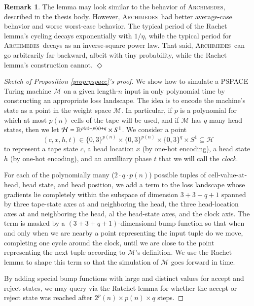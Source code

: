 \documentclass[openany, notitlepage, justified]{tufte-book}
\theoremstyle{plain}
\theoremstyle{definition}
\newtheorem{rmk}{Remark}
\newcommand{\Hh}{\mathcal{H}}
\newcommand{\Mm}{\mathcal{M}}
\newcommand{\mend}{\hfill $\Diamond$}
\newcommand{\Archimedes}{\textsc{Archimedes}}
\begin{document}
        \begin{rmk}
            The lemma may look similar to the behavior of \Archimedes,
            described in the thesis body.  However, \Archimedes\ had better
            average-case behavior and worse worst-case behavior. 
            The typical period of the Rachet lemma's cycling 
            decays exponentially with $1/\eta$, while the typical period for
            \Archimedes\ decays as an inverse-square power law.  That said,
            \Archimedes\ can go arbitrarily far backward, albeit with tiny
            probability, while the Rachet lemma's construction cannot.
            \mend
        \end{rmk}

        \begin{proof}[Sketch of Proposition \ref{prop:pspace}'s proof]
            We show how to simulate a PSPACE Turing machine $\Mm$ on a given
            length-$n$ input in only polynomial time by constructing an
            appropriate loss landscape.  The idea is to encode the machine's
            state as a point in the weight space $\Mm$.  In particular, if $p$
            is a polynomial for which at most $p(n)$ cells of the tape will be
            used, and if $\Mm$ has $q$ many head states, then we let $\Hh =
            \RR^{p(n)+p(n)+q} \times S^1$.  We consider a point
            $$
                (c,x,h,t)\in\{0,3\}^{p(n)}\times\{0,3\}^{p(n)}\times\{0,3\}^{q}\times S^1\subseteq \Hh
            $$
            to represent a tape state $c$, a head location $x$ (by one-hot encoding),
            a head state $h$ (by one-hot encoding), and an auxilliary phase $t$
            that we will call the \emph{clock}.

            For each of the polynomially many ($2 \cdot q \cdot p(n)$) possible
            tuples of cell-value-at-head, head state, and head position, we add
            a term to the loss landscape whose gradients lie completely within
            the subspace of dimension $3+3+q+1$ spanned by three tape-state
            axes at and neighboring the head, the three head-location axes at
            and neighboring the head, al the head-state axes, and the clock
            axis.  The term is masked by a $(3+3+q+1)$-dimensional bump
            function so that when and only when we are nearby a point
            representing the input tuple do we move, completing one cycle
            around the clock, until we are close to the point representing the
            next tuple according to $\Mm$'s definition.  We use the Rachet
            lemma to shape this term so that the simulation of $\Mm$ goes
            forward in time.

            By adding special bump functions with large and distinct values for 
            accept and reject states, we may query via the Ratchet lemma for 
            whether the accept or reject state was reached after
            $2^p(n)\times p(n)\times q$ steps. 
        \end{proof}
\end{document}

